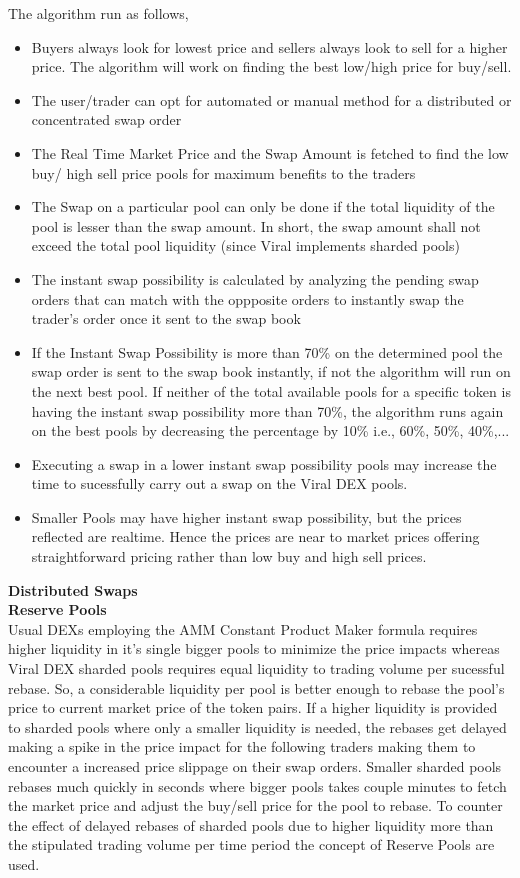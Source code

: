 \documentclass[10pt]{article}
\begin{document}
The algorithm run as follows,
\begin{itemize}[leftmargin=+0.2in]
\item Buyers always look for lowest price and sellers always look to sell for a higher price. The algorithm will work on finding the best low/high price for buy/sell.
\item The user/trader can opt for automated or manual method for a distributed or concentrated swap order
\item The Real Time Market Price and the Swap Amount is fetched to find the low buy/ high sell price pools for maximum benefits to the traders
\item The Swap on a particular pool can only be done if the total liquidity of the pool is lesser than the swap amount. In short, the swap amount shall not exceed the total pool liquidity (since Viral implements sharded pools)
\item The instant swap possibility is calculated by analyzing the pending swap orders that can match with the oppposite orders to instantly swap the trader's order once it sent to the swap book
\item If the Instant Swap Possibility is more than 70\% on the determined pool the swap order is sent to the swap book instantly, if not the algorithm will run on the next best pool. If neither of the total available pools for a specific token is having the instant swap possibility more than 70\%, the algorithm runs again on the best pools by decreasing the percentage by 10\% i.e., 60\%, 50\%, 40\%,...
\item Executing a swap in a lower instant swap possibility pools may increase the time to sucessfully carry out a swap on the Viral DEX pools.
\item Smaller Pools may have higher instant swap possibility, but the prices reflected are realtime. Hence the prices are near to market prices offering straightforward pricing rather than low buy and high sell prices.
\end{itemize}

\textbf{Distributed Swaps}\\


\textbf{Reserve Pools}\\

Usual DEXs employing the AMM Constant Product Maker formula requires higher liquidity in it's single bigger pools to minimize the price impacts whereas Viral DEX sharded pools requires equal liquidity to trading volume per sucessful rebase. So, a considerable liquidity per pool is better enough to rebase the pool's price to current market price of the token pairs. If a higher liquidity is provided to sharded pools where only a smaller liquidity is needed, the rebases get delayed making a spike in the price impact for the following traders making them to encounter a increased price slippage on their swap orders. Smaller sharded pools rebases much quickly in seconds where bigger pools takes couple minutes to fetch the market price and adjust the buy/sell price for the pool to rebase. To counter the effect of delayed rebases of sharded pools due to higher liquidity more than the stipulated trading volume per time period the concept of Reserve Pools are used.\\
\end{document}
